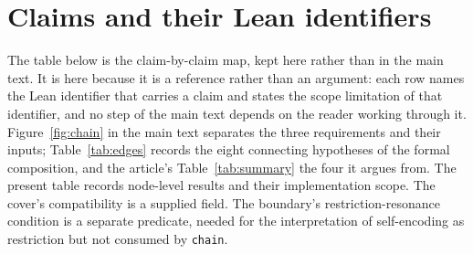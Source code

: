 \documentclass{article}
\begin{document}
\section{Claims and their Lean identifiers}
\renewcommand{\thetable}{S\arabic{table}}
\setcounter{table}{0}
The table below is the claim-by-claim map, kept here rather than in the main
text. It is here because it is a reference rather than an argument: each row names
the Lean identifier that carries a claim and states the scope limitation of that
identifier, and no step of the main text depends on the reader working through it.
Figure~\ref{fig:chain} in the main text separates the three requirements and their inputs; Table~\ref{tab:edges} records the eight connecting hypotheses of the formal composition, and the article's Table~\ref{tab:summary} the four it argues from. The present table records node-level results and their implementation scope. The cover's compatibility is a supplied field. The boundary's restriction-resonance condition is a separate predicate, needed for the interpretation of self-encoding as restriction but not consumed by \texttt{chain}.
\end{document}
